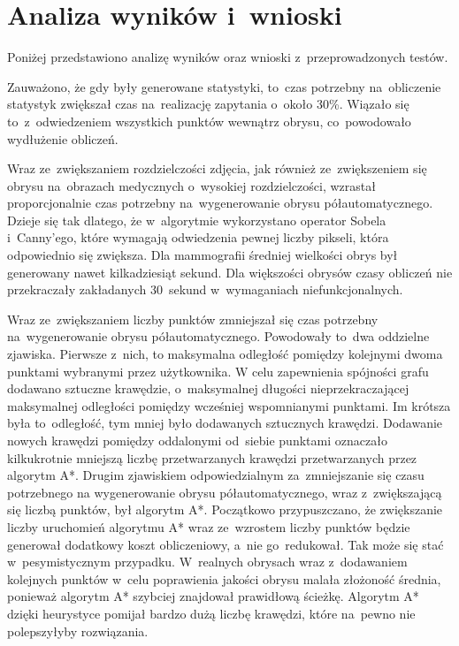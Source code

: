\documentclass[a4paper,11pt,twoside,openright]{report}
\theoremstyle{definition}
\begin{document}
\section {Analiza wyników i~wnioski}

Poniżej przedstawiono analizę wyników oraz wnioski z~przeprowadzonych testów.

Zauważono, że gdy były generowane statystyki, to~czas potrzebny na~obliczenie statystyk
zwiększał czas na~realizację zapytania o~około 30\%. Wiązało się to~z~odwiedzeniem
wszystkich punktów wewnątrz obrysu, co~powodowało wydłużenie obliczeń.

Wraz ze~zwiększaniem rozdzielczości zdjęcia, jak również ze~zwiększeniem się
obrysu na~obrazach medycznych o~wysokiej rozdzielczości, wzrastał proporcjonalnie
czas potrzebny na~wygenerowanie obrysu półautomatycznego. Dzieje się tak dlatego,
że w~algorytmie wykorzystano operator Sobela i~Canny'ego, które wymagają odwiedzenia
pewnej liczby pikseli, która odpowiednio się zwiększa. Dla mammografii średniej
wielkości obrys był generowany nawet kilkadziesiąt sekund. Dla większości obrysów
czasy obliczeń nie przekraczały zakładanych 30~sekund w~wymaganiach niefunkcjonalnych.

Wraz ze~zwiększaniem liczby punktów zmniejszał się czas potrzebny na~wygenerowanie
obrysu półautomatycznego. Powodowały to~dwa oddzielne zjawiska. Pierwsze z~nich, to
maksymalna odległość pomiędzy kolejnymi dwoma punktami wybranymi przez użytkownika.
W celu zapewnienia spójności grafu dodawano sztuczne krawędzie, o~maksymalnej długości
nieprzekraczającej maksymalnej odległości pomiędzy wcześniej wspomnianymi punktami.
Im krótsza była to~odległość, tym mniej było dodawanych sztucznych krawędzi.
Dodawanie nowych krawędzi pomiędzy oddalonymi od~siebie punktami oznaczało
kilkukrotnie mniejszą liczbę przetwarzanych krawędzi przetwarzanych przez algorytm
A*. Drugim zjawiskiem odpowiedzialnym za~zmniejszanie się czasu potrzebnego na
wygenerowanie obrysu półautomatycznego, wraz z~zwiększającą się liczbą punktów,
był algorytm A*. Początkowo przypuszczano, że zwiększanie liczby uruchomień algorytmu
A* wraz ze~wzrostem liczby punktów będzie generował dodatkowy koszt obliczeniowy,
a~nie go~redukował. Tak może się stać w~pesymistycznym przypadku. W~realnych
obrysach wraz z~dodawaniem kolejnych punktów w~celu poprawienia jakości obrysu
malała złożoność średnia, ponieważ algorytm A* szybciej znajdował prawidłową
ścieżkę. Algorytm A* dzięki heurystyce pomijał bardzo dużą liczbę krawędzi,
które na~pewno nie polepszyłyby rozwiązania.
\end{document}
